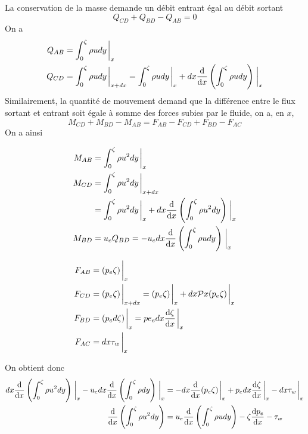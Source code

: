     La conservation de la masse demande un débit entrant égal au débit sortant
    \begin{equation}
      Q_{CD} + Q_{BD} - Q_{AB} = 0
    \end{equation}
    On a
    \begin{equation}
      \begin{aligned}
        Q_{AB} &= \int_0^\zeta \rho u dy \eval_{x}\\
        Q_{CD} &= \int_0^\zeta \rho u dy \eval_{x + dx} = \int_{0}^{\zeta} \rho u dy \eval_x + dx \dv{x}\left( \int_{0}^{\zeta} \rho u dy\right)\eval_{x}
      \end{aligned}
    \end{equation}
    Similairement, la quantité de mouvement demand que la différence entre le flux sortant et entrant soit égale à somme des forces subies par le fluide, on a, en $x$,
    \begin{equation}
      M_{CD} + M_{BD} - M_{AB} = F_{AB} - F_{CD} + F_{BD} - F_{AC}
    \end{equation}
    On a ainsi
    \begin{multicols}{2}
      \begin{equation*}
        \begin{aligned}
          M_{AB} &= \int_0^\zeta \rho u^2 dy \eval_x\\
          M_{CD} &= \int_0^\zeta \rho u^2 dy \eval_{x+dx}\\
                 &= \int_0^\zeta \rho u^2 dy \eval_{x} + dx\dv{x}\left(\int_0^\zeta \rho u^2 dy\right)\eval_x\\
          M_{BD} &= u_e Q_{BD} = -u_e dx \dv{x}\left(\int_0^\zeta \rho u dy \right) \eval_x
        \end{aligned}
      \end{equation*}

      \begin{equation}
        \begin{aligned}
          F_{AB} &= (p_e \zeta)\eval_x\\
          F_{CD} &= (p_e \zeta)\eval_{x+dx} = (p_e \zeta)\eval_{x} + dx \pv{x}(p_e \zeta)\eval_x\\
          F_{BD} &= (p_e d\zeta)\eval_x = pe_e dx\dv{\zeta}{x}\eval_x\\
          F_{AC} &= dx \tau_w \eval_x
        \end{aligned}
      \end{equation}
    \end{multicols}
    On obtient donc
    \begin{equation}
      \begin{aligned}
        dx \dv{x}\left(\int_0^\zeta \rho u^2 dy\right) \eval_x -u_e dx \dv{x}\left(\int_0^\zeta \rho dy\right)\eval_x &=
        -dx\dv{x}(p_e\zeta)\eval_x + p_e dx\dv{\zeta}{x}\eval_x - dx \tau_w \eval_x\\
        \dv{x}\left(\int_0^\zeta \rho u^2 dy\right) &= u_e \dv{x}\left(\int_0^\zeta \rho u dy\right) - \zeta \dv{p_e}{x} - \tau_w
      \end{aligned}
    \end{equation}

